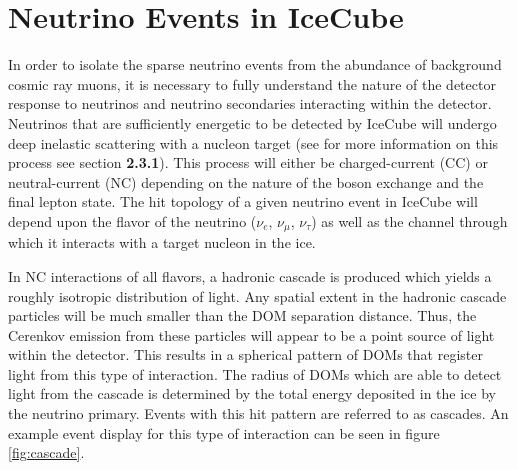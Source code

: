 \documentclass{gatech-thesis}
\begin{document}
\section{Neutrino Events in IceCube}

In order to isolate the sparse neutrino events from the abundance of background cosmic ray muons, it is necessary to fully understand the nature of the detector response to neutrinos and neutrino secondaries interacting within the detector. Neutrinos that are sufficiently energetic to be detected by IceCube will undergo deep inelastic scattering with a nucleon target (see for more information on this process see section \textbf{2.3.1}). This process will either be charged-current (CC) or neutral-current (NC) depending on the nature of the boson exchange and the final lepton state. The hit topology of a given neutrino event in IceCube will depend upon the flavor of the neutrino ($\nu_{e}$, $\nu_{\mu}$, $\nu_{\tau}$) as well as the channel through which it interacts with a target nucleon in the ice.

In NC interactions of all flavors, a hadronic cascade is produced which yields a roughly isotropic distribution of light. Any spatial extent in the hadronic cascade particles will be much smaller than the DOM separation distance. Thus, the Cerenkov emission from these particles will appear to be a point source of light within the detector. This results in a spherical pattern of DOMs that register light from this type of interaction. The radius of DOMs which are able to detect light from the cascade is determined by the total energy deposited in the ice by the neutrino primary. Events with this hit pattern are referred to as cascades. An example event display for this type of interaction can be seen in figure \ref{fig:cascade}.
\end{document}
